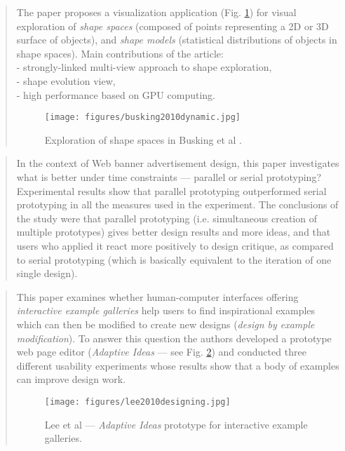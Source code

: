 		\begin{quote}
		\small
		The paper proposes a visualization application (Fig. \ref{fig:busking2010dynamic}) 
		for visual exploration of
		{\em shape spaces} (composed of points representing a 2D or 3D surface of objects), and 
		{\em shape models} (statistical distributions of objects in shape spaces). Main
		contributions of the article:\\
		- strongly-linked multi-view approach to shape exploration,\\
		- shape evolution view,\\
		- high performance based on GPU computing.
		\begin{figure}[htb]
		\begin{center}
		\texttt{[image: figures/busking2010dynamic.jpg]}
		\caption{Exploration of shape spaces in Busking et al \cite{busking2010dynamic}.}
		\label{fig:busking2010dynamic}
		\end{center}
		\end{figure}				
		\end{quote}
				
		\begin{quote}
		\small
		In the context of Web banner advertisement design, this paper investigates what is 
		better under time constraints --- parallel or serial prototyping?
		Experimental results show that parallel prototyping outperformed serial prototyping
		in all the measures used in the experiment. The conclusions of the study were that
		parallel prototyping (i.e. simultaneous creation of multiple prototypes) 
		gives better design results and more ideas, and that users
		who applied it react more positively to design critique, as compared to serial
		prototyping (which is basically equivalent to the iteration of one single design).
		\end{quote}

		\begin{quote}
		\small
		This paper examines whether human-computer interfaces offering {\em interactive example galleries} 
		help users to find inspirational examples which can then be modified to create new designs
		({\em design by example modification}). To answer this question the authors developed 
		a prototype web page editor ({\em Adaptive Ideas} --- see Fig. \ref{fig:lee2010designing}) 
		and conducted
		three different usability experiments whose results show that a body of examples
		can improve design work.
		\begin{figure}[htb]
		\begin{center}
		\texttt{[image: figures/lee2010designing.jpg]}
		\caption{Lee et al \cite{lee2010designing} --- {\em Adaptive Ideas} prototype for interactive
		example galleries.}
		\label{fig:lee2010designing}
		\end{center}
		\end{figure}				
		\end{quote}



